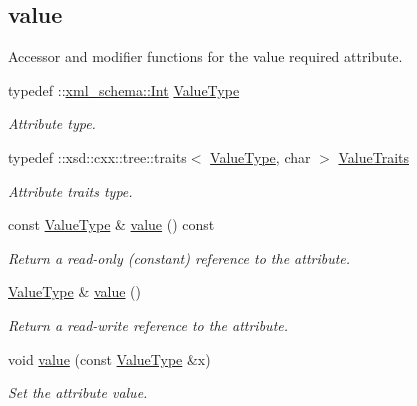 \subsection*{value}
\label{_amgrp2063c1608d6e0baf80249c42e2be5804}
Accessor and modifier functions for the value required attribute. \begin{DoxyCompactItemize}
\item 
\hypertarget{classopenstack_1_1xml_1_1RateLimit_acafa69c685469c50108cb0f4c54a5ce2}{
typedef ::\hyperlink{namespacexml__schema_a12d975a13061c938969b2b5143e97645}{xml\_\-schema::Int} \hyperlink{classopenstack_1_1xml_1_1RateLimit_acafa69c685469c50108cb0f4c54a5ce2}{ValueType}}
\label{classopenstack_1_1xml_1_1RateLimit_acafa69c685469c50108cb0f4c54a5ce2}

\begin{DoxyCompactList}\small\item\em Attribute type. \item\end{DoxyCompactList}\item 
\hypertarget{classopenstack_1_1xml_1_1RateLimit_a1e0525d62e19b62a911c9ecaeaf2ba2b}{
typedef ::xsd::cxx::tree::traits$<$ \hyperlink{classopenstack_1_1xml_1_1RateLimit_acafa69c685469c50108cb0f4c54a5ce2}{ValueType}, char $>$ \hyperlink{classopenstack_1_1xml_1_1RateLimit_a1e0525d62e19b62a911c9ecaeaf2ba2b}{ValueTraits}}
\label{classopenstack_1_1xml_1_1RateLimit_a1e0525d62e19b62a911c9ecaeaf2ba2b}

\begin{DoxyCompactList}\small\item\em Attribute traits type. \item\end{DoxyCompactList}\item 
const \hyperlink{classopenstack_1_1xml_1_1RateLimit_acafa69c685469c50108cb0f4c54a5ce2}{ValueType} \& \hyperlink{classopenstack_1_1xml_1_1RateLimit_a469ce1ffa2758bd6b152d9d2672c698e}{value} () const 
\begin{DoxyCompactList}\small\item\em Return a read-\/only (constant) reference to the attribute. \item\end{DoxyCompactList}\item 
\hyperlink{classopenstack_1_1xml_1_1RateLimit_acafa69c685469c50108cb0f4c54a5ce2}{ValueType} \& \hyperlink{classopenstack_1_1xml_1_1RateLimit_a08840bc279a6097aec1999cb6e92ec09}{value} ()
\begin{DoxyCompactList}\small\item\em Return a read-\/write reference to the attribute. \item\end{DoxyCompactList}\item 
void \hyperlink{classopenstack_1_1xml_1_1RateLimit_a4a85a6bee38b0ab4004f9a445528350e}{value} (const \hyperlink{classopenstack_1_1xml_1_1RateLimit_acafa69c685469c50108cb0f4c54a5ce2}{ValueType} \&x)
\begin{DoxyCompactList}\small\item\em Set the attribute value. \item\end{DoxyCompactList}\end{DoxyCompactItemize}
